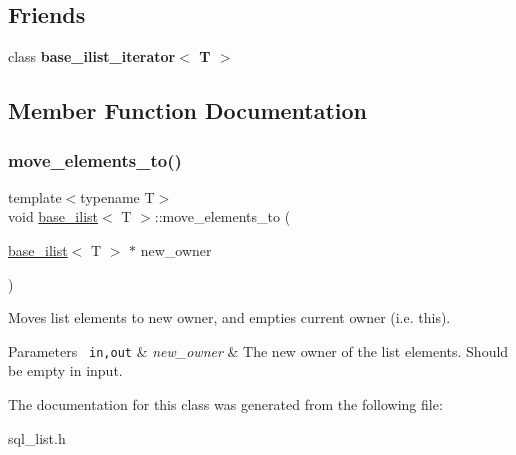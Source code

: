 \subsection*{Friends}
\begin{DoxyCompactItemize}
\item 
\mbox{\label{classbase__ilist_a5f6322da57ee6c6390276f21b3971a3d}} 
class {\bfseries base\+\_\+ilist\+\_\+iterator$<$ T $>$}
\end{DoxyCompactItemize}


\subsection{Member Function Documentation}
\mbox{\label{classbase__ilist_a8e672dae8c5a44363d344aa06a47dc88}} 
\subsubsection{\texorpdfstring{move\+\_\+elements\+\_\+to()}{move\_elements\_to()}}
{\footnotesize\ttfamily template$<$typename T$>$ \\
void \mbox{\hyperlink{classbase__ilist}{base\+\_\+ilist}}$<$ T $>$\+::move\+\_\+elements\+\_\+to (\begin{DoxyParamCaption}\item[{\mbox{\hyperlink{classbase__ilist}{base\+\_\+ilist}}$<$ T $>$ $\ast$}]{new\+\_\+owner }\end{DoxyParamCaption})\hspace{0.3cm}{\ttfamily [inline]}}

Moves list elements to new owner, and empties current owner (i.\+e. this).


\begin{DoxyParams}[1]{Parameters}
\mbox{\texttt{ in,out}}  & {\em new\+\_\+owner} & The new owner of the list elements. Should be empty in input. \\
\hline
\end{DoxyParams}


The documentation for this class was generated from the following file\+:\begin{DoxyCompactItemize}
\item 
sql\+\_\+list.\+h\end{DoxyCompactItemize}
